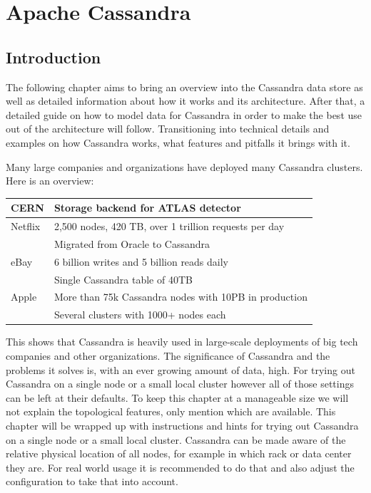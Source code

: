 \chapter{Apache Cassandra}

\section{Introduction}


The following chapter aims to bring an overview into the Cassandra data store as well as detailed information about how it works and its architecture.
After that, a detailed guide on how to model data for Cassandra in order to make the best use out of the architecture will follow.
Transitioning into technical details and examples on how Cassandra works, what features and pitfalls it brings with it.


Many large companies and organizations have deployed many Cassandra clusters.
Here is an overview: \\

 \begin{tabular}{@{}ll}
   CERN    & Storage backend for ATLAS detector \autocite{cassandra_cern} \\
   \hline
   Netflix & 2,500 nodes, 420 TB, over 1 trillion requests per day \\
           & Migrated from Oracle to Cassandra \autocite{cassandra_netflix} \\
   \hline
   eBay    & 6 billion writes and 5 billion reads daily \\
           & Single Cassandra table of 40TB \autocite{cassandra_ebay, cassandra_ebay2} \\
   \hline
   Apple   & More than 75k Cassandra nodes with 10PB in production \\
           & Several clusters with 1000+ nodes each \autocite{cassandra_apple} \\
 \end{tabular}

This shows that Cassandra is heavily used in large-scale deployments of big tech companies and other organizations. The significance of Cassandra and the problems it solves is, with an ever growing amount of data, high.
For trying out Cassandra on a single node or a small local cluster however all of those settings can be left at their defaults. To keep this chapter at a manageable size we will not explain the topological features, only mention which are available.
This chapter will be wrapped up with instructions and hints for trying out Cassandra on a single node or a small local cluster. 
Cassandra can be made aware of the relative physical location of all nodes, for example in which rack or data center they are. For real world usage it is recommended to do that and also adjust the configuration to take that into account.


